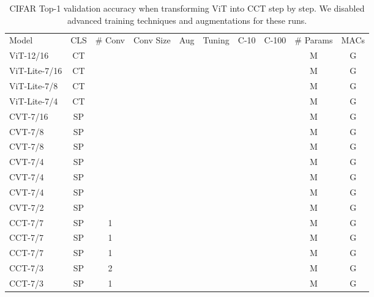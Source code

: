 \documentclass[10pt,twocolumn,letterpaper]{article}
\newcommand{\cmark}{\ding{51}}
\newcommand{\xmark}{\ding{55}}
\begin{document}
\setlength{\tabcolsep}{6pt}
\begin{table*}[htb]
    \begin{center}
        \caption{CIFAR Top-1 validation accuracy when transforming ViT into CCT step by step. We disabled advanced training techniques and augmentations for these runs.}
        \label{tab:ablation_summary}
        \begin{tabular}{lccccc|cc|cc}
            \hline\noalign{\smallskip}
            Model & CLS & \# Conv & Conv Size & Aug & Tuning & C-10 & C-100 & \# Params & MACs\\
            \noalign{\smallskip}
            \hline
            \noalign{\smallskip}
            ViT-12/16 & CT & \xmark & \xmark & \xmark & \xmark &  &  &  M &  G \\
            \noalign{\smallskip}
            \hline
            \noalign{\smallskip}
            ViT-Lite-7/16 & CT & \xmark & \xmark & \xmark & \xmark &  &  &  M &  G \\
            ViT-Lite-7/8 & CT & \xmark & \xmark & \xmark & \xmark &  &  &  M &  G \\
            ViT-Lite-7/4 & CT & \xmark & \xmark & \xmark & \xmark &  &  &  M &  G \\
            \noalign{\smallskip}
            \hline
            \noalign{\smallskip}
            CVT-7/16 & SP & \xmark & \xmark & \xmark & \xmark &  &  &  M &  G \\
            CVT-7/8 & SP & \xmark & \xmark & \xmark & \xmark &  &  &  M &  G \\
            CVT-7/8 & SP & \xmark & \xmark & \cmark & \xmark &  &  &  M &  G \\
            CVT-7/4 & SP & \xmark & \xmark & \xmark & \xmark &  &  &  M &  G \\
            CVT-7/4 & SP & \xmark & \xmark & \cmark & \xmark &  &  &  M &  G \\
            CVT-7/4 & SP & \xmark & \xmark & \cmark & \cmark &  &  &  M &  G \\
            CVT-7/2 & SP & \xmark & \xmark & \xmark & \xmark &  &  &  M &  G \\
            \noalign{\smallskip}
            \hline
            \noalign{\smallskip}
            CCT-7/7\texttimes1 & SP & 1 &  & \xmark & \xmark &  &  &  M &  G \\
            CCT-7/7\texttimes1 & SP & 1 &  & \cmark & \xmark &  &  &  M &  G \\
            CCT-7/7\texttimes1 & SP & 1 &  & \cmark & \cmark &  &  &  M &  G \\
            \noalign{\smallskip}
            \hline
            \noalign{\smallskip}
            CCT-7/3\texttimes2 & SP & 2 &  & \cmark & \cmark &  &  &  M &  G \\
            \noalign{\smallskip}
            \hline
            \noalign{\smallskip}
            CCT-7/3\texttimes1 & SP & 1 &  & \cmark & \cmark &  &  &  M &  G \\
            \hline
        \end{tabular}
    \end{center}
\end{table*} 
\end{document}
